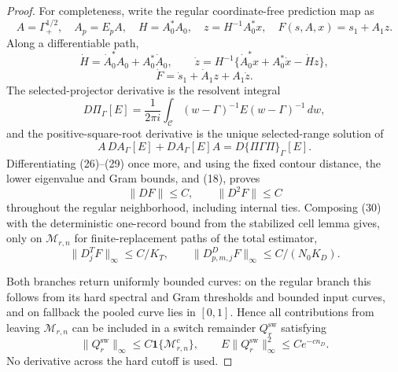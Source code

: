 \documentclass{article}
\begin{document}
\begin{proof}
For completeness, write the regular coordinate-free prediction map as
\[
 A=\Gamma_+^{1/2},\quad A_p=E_pA,\quad H=A_0^*A_0,
 \quad z=H^{-1}A_0^*x,
 \quad F(s,A,x)=s_1+A_1z.                              \tag{25}
\]
Along a differentiable path,
\[
 \dot H=\dot A_0^*A_0+A_0^*\dot A_0,
 \qquad
 \dot z=H^{-1}\{\dot A_0^*x+A_0^*\dot x-\dot Hz\},  \tag{26}
\]
\[
 \dot F=\dot s_1+\dot A_1z+A_1\dot z.                \tag{27}
\]
The selected-projector derivative is the resolvent integral
\[
 D\Pi_\Gamma[E]=\frac{1}{2\pi i}\int_{\mathscr C}
 (w-\Gamma)^{-1}E(w-\Gamma)^{-1}\,dw,                 \tag{28}
\]
and the positive-square-root derivative is the unique selected-range
solution of
\[
 A\,DA_\Gamma[E]+DA_\Gamma[E]A
 =D\{\Pi\Gamma\Pi\}_\Gamma[E].                        \tag{29}
\]
Differentiating (26)--(29) once more, and using the fixed contour distance,
the lower eigenvalue and Gram bounds, and (18), proves
\[
 \|DF\|\leq C,
 \qquad \|D^2F\|\leq C                                \tag{30}
\]
throughout the regular neighborhood, including internal ties.  Composing
(30) with the deterministic one-record bound from the stabilized cell lemma
gives, only on \(\mathcal M_{r,n}\) for finite-replacement paths of the total
estimator,
\[
 \|D_j^TF\|_\infty\leq C/K_T,
 \qquad
 \|D_{p,m,j}^DF\|_\infty\leq C/(N_0K_D).              \tag{31}
\]

Both branches return uniformly bounded curves: on the regular branch this
follows from its hard spectral and Gram thresholds and bounded input curves,
and on fallback the pooled curve lies in \([0,1]\).  Hence all contributions
from leaving \(\mathcal M_{r,n}\) can be included in a switch remainder
\(Q_r^{\mathrm{sw}}\) satisfying
\[
 \|Q_r^{\mathrm{sw}}\|_\infty
 \leq C\mathbf1\{\mathcal M_{r,n}^c\},
 \qquad
 E\|Q_r^{\mathrm{sw}}\|_\infty^2\leq Ce^{-cn_D}.      \tag{32}
\]
No derivative across the hard cutoff is used.


\end{proof}
\end{document}
